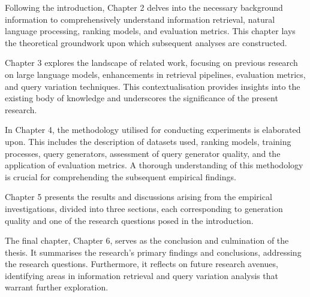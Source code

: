 Following the introduction, Chapter 2 delves into the necessary background information to comprehensively understand information retrieval, natural language processing, ranking models, and evaluation metrics. This chapter lays the theoretical groundwork upon which subsequent analyses are constructed.

Chapter 3 explores the landscape of related work, focusing on previous research on large language models, enhancements in retrieval pipelines, evaluation metrics, and query variation techniques. This contextualisation provides insights into the existing body of knowledge and underscores the significance of the present research.

In Chapter 4, the methodology utilised for conducting experiments is elaborated upon. This includes the description of datasets used, ranking models, training processes, query generators, assessment of query generator quality, and the application of evaluation metrics. A thorough understanding of this methodology is crucial for comprehending the subsequent empirical findings.

Chapter 5 presents the results and discussions arising from the empirical investigations, divided into three sections, each corresponding to generation quality and one of the research questions posed in the introduction.

The final chapter, Chapter 6, serves as the conclusion and culmination of the thesis. It summarises the research's primary findings and conclusions, addressing the research questions. Furthermore, it reflects on future research avenues, identifying areas in information retrieval and query variation analysis that warrant further exploration.
